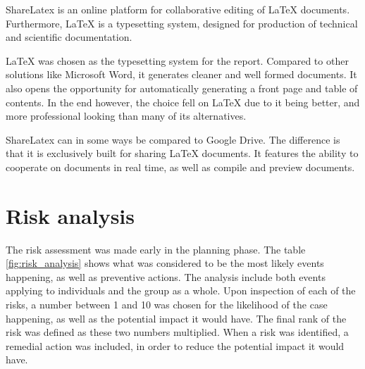 ShareLatex \cite{sharelatex} is an online platform for collaborative editing of LaTeX documents. Furthermore, LaTeX is a typesetting system, designed for production of technical and scientific documentation.

LaTeX was chosen as the typesetting system for the report. Compared to other solutions like Microsoft Word, it generates cleaner and well formed documents. It also opens the opportunity for automatically generating a front page and table of contents. In the end however, the choice fell on LaTeX due to it being better, and more professional looking than many of its alternatives.

ShareLatex can in some ways be compared to Google Drive. The difference is that it is exclusively built for sharing LaTeX documents. It features the ability to cooperate on documents in real time, as well as compile and preview documents.

\section{Risk analysis}
\label{sec:prestudies-risk_analysis}

The risk assessment was made early in the planning phase. The table \ref{fig:risk_analysis} shows what was considered to be the most likely events happening, as well as preventive actions. The analysis include both events applying to individuals and the group as a whole. Upon inspection of each of the risks, a number between 1 and 10 was chosen for the likelihood of the case happening, as well as the potential impact it would have. The final rank of the risk was defined as these two numbers multiplied. When a risk was identified, a remedial action was included, in order to reduce the potential impact it would have.

